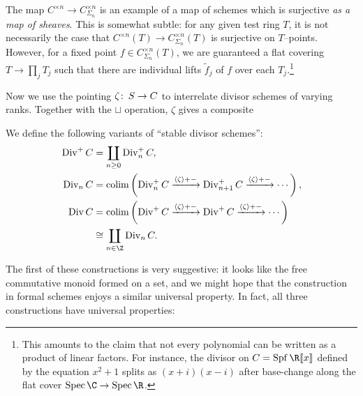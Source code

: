 \begin{remark}
The map $C^{\times n} \to C^{\times n}_{\Sigma_n}$ is an example of a map of schemes which is surjective \emph{as a map of sheaves}.  This is somewhat subtle: for any given test ring $T$, it is not necessarily the case that $C^{\times n}(T) \to C^{\times n}_{\Sigma_n}(T)$ is surjective on $T$--points.  However, for a fixed point $f \in C^{\times n}_{\Sigma_n}(T)$, we are guaranteed a flat covering $T \to \prod_j T_j$ such that there are individual lifts $\widetilde f_j$ of $f$ over each $T_j$.\footnote{This amounts to the claim that not every polynomial can be written as a product of linear factors.  For instance, the divisor on $C = \Spf \R\ps{x}$ defined by the equation $x^2 + 1$ splits as $(x + i)(x - i)$ after base-change along the flat cover $\Spec \C \to \Spec \R$.}
\end{remark}

Now we use the pointing $\zeta\colon\thinspace S \to C$ to interrelate divisor schemes of varying ranks.  Together with the $\sqcup$ operation, $\zeta$ gives a composite
\begin{center}
\end{center}

\begin{definition}\label{StableDivisorSchemeDefn}
We define the following variants of ``stable divisor schemes'':
\begin{align*}
\Div^+ C & = \coprod_{n \ge 0} \Div_n^+ C, \\
\Div_n C & = \colim \left( \Div_n^+ C \xrightarrow{\<\zeta\> + -} \Div_{n+1}^+ C \xrightarrow{\<\zeta\> + -} \cdots \right), \\
\Div C & = \colim \left( \Div^+ C \xrightarrow{\<\zeta\> + -} \Div^+ C \xrightarrow{\<\zeta\> + -} \cdots \right) \\
& \cong \coprod_{n \in \Z} \Div_n C.
\end{align*}
\end{definition}

\noindent The first of these constructions is very suggestive: it looks like the free commutative monoid formed on a set, and we might hope that the construction in formal schemes enjoys a similar universal property.  In fact, all three constructions have universal properties:

